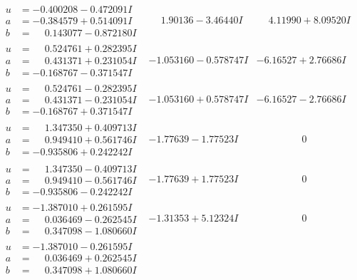 \documentclass[1p]{elsarticle_modified}
\theoremstyle{definition}
\begin{document}
$$\begin{array}{c|c|c}
\begin{aligned}
u &= -0.400208 - 0.472091 I \\
a &= -0.384579 + 0.514091 I \\
b &= \phantom{-}0.143077 - 0.872180 I\end{aligned}
 & \phantom{-}1.90136 - 3.46440 I & \phantom{-}4.11990 + 8.09520 I \\ \hline\begin{aligned}
u &= \phantom{-}0.524761 + 0.282395 I \\
a &= \phantom{-}0.431371 + 0.231054 I \\
b &= -0.168767 - 0.371547 I\end{aligned}
 & -1.053160 - 0.578747 I & -6.16527 + 2.76686 I \\ \hline\begin{aligned}
u &= \phantom{-}0.524761 - 0.282395 I \\
a &= \phantom{-}0.431371 - 0.231054 I \\
b &= -0.168767 + 0.371547 I\end{aligned}
 & -1.053160 + 0.578747 I & -6.16527 - 2.76686 I \\ \hline\begin{aligned}
u &= \phantom{-}1.347350 + 0.409713 I \\
a &= \phantom{-}0.949410 + 0.561746 I \\
b &= -0.935806 + 0.242242 I\end{aligned}
 & -1.77639 - 1.77523 I & \phantom{-0.000000 } 0 \\ \hline\begin{aligned}
u &= \phantom{-}1.347350 - 0.409713 I \\
a &= \phantom{-}0.949410 - 0.561746 I \\
b &= -0.935806 - 0.242242 I\end{aligned}
 & -1.77639 + 1.77523 I & \phantom{-0.000000 } 0 \\ \hline\begin{aligned}
u &= -1.387010 + 0.261595 I \\
a &= \phantom{-}0.036469 - 0.262545 I \\
b &= \phantom{-}0.347098 - 1.080660 I\end{aligned}
 & -1.31353 + 5.12324 I & \phantom{-0.000000 } 0 \\ \hline\begin{aligned}
u &= -1.387010 - 0.261595 I \\
a &= \phantom{-}0.036469 + 0.262545 I \\
b &= \phantom{-}0.347098 + 1.080660 I\end{aligned}

\end{array}$$
\end{document}
